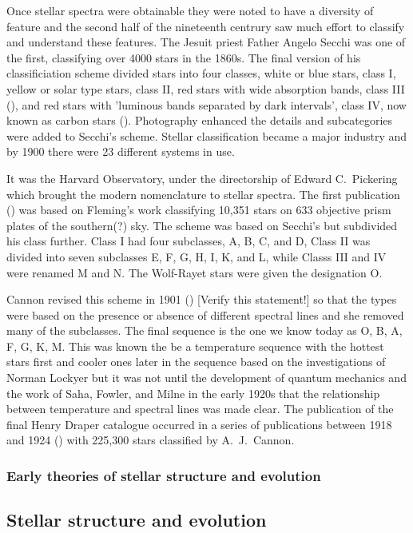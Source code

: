 Once stellar spectra were obtainable  they were
noted to have a diversity of feature and the second half of the
nineteenth centrury saw much effort to classify and understand these
features.  The Jesuit priest Father Angelo Secchi was one of the
first, classifying over 4000 stars in the 1860s.  The final version of
his classificiation scheme  divided stars into four
classes, white or blue stars, class I, yellow or solar type stars,
class II, red stars with wide absorption bands, class III
(\cite{Secchi1863}), and red stars with 'luminous bands separated by
dark intervals', class IV, now known as carbon stars
(\cite{Secchi1868}). Photography enhanced the details and subcategories
were added to Secchi's scheme.  Stellar classification became a major
industry and by 1900 there were 23 different systems in use.

It was the Harvard Observatory, under the directorship of Edward C.\
Pickering which brought the modern nomenclature to stellar spectra.
The first publication (\cite{Pickering1890}) was based on Fleming's
work classifying 10,351 stars on 633 objective prism plates of the
southern(?) sky. The scheme was based on Secchi's but subdivided his
class further. Class I had four subclasses, A, B, C, and D, Class II
was divided into seven subclasses E, F, G, H, I, K, and L, while
Classs III and IV were renamed M and N.  The Wolf-Rayet stars were
given the designation O.

Cannon  revised this scheme in 1901
(\cite{Cannon1901}) [Verify this statement!] so that the types were
based on the presence or absence of different spectral lines and she
removed many of the subclasses.  The final sequence is the one we know
today as O, B, A, F, G, K, M. This was known the be a temperature
sequence with the hottest stars first and cooler ones later in the
sequence based on the investigations of Norman Lockyer but it was not
until the development of quantum mechanics and the work of Saha,
Fowler, and Milne in the early 1920s that the relationship between
temperature and spectral lines was made clear. The
publication  of the final Henry Draper catalogue
occurred in a series of publications between 1918 and 1924
(\cite{Cannon1918a, Cannon1918b, Cannon1919a ,Cannon1919b, Cannon1920,
Cannon1921, Cannon1922, Cannon1923, Cannon1924}) with 225,300 stars
classified by A.\ J.\ Cannon.

\subsubsection{Early theories of stellar structure and evolution}



\subsection{Stellar structure and evolution}

